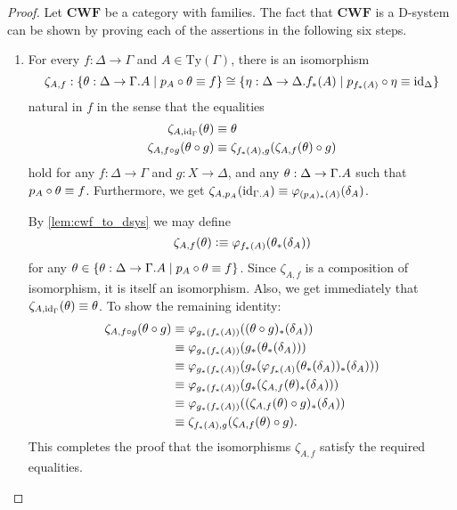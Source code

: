 \begin{proof}%
Let $\mathbf{CWF}$ be a category with families. The fact that $\mathbf{CWF}$ is
a D-system can be shown by proving each of the assertions in the following six 
steps.
\begin{enumerate}
\item For every $f:\Delta\to\Gamma$ and $A\in\mathrm{Ty}(\Gamma)$, there is an
isomorphism
\begin{equation*}
\zeta_{A,f}:\{\theta:\Delta\to\ctxext{\Gamma}{A}\mid p_A\circ\theta\jdeq f\}
  \cong
\{\eta:\Delta\to\ctxext{\Delta}{f_\ast(A)}\mid p_{f_\ast(A)}\circ\eta\jdeq\catid{\Delta}\}
\end{equation*}
natural in $f$ in the sense that the equalities
\begin{align*}
\zeta_{A,{\mathrm{id}_{\Gamma}}}(\theta) & \equiv \theta \\
\zeta_{A,f\circ g}(\theta\circ g) & \equiv \zeta_{f_\ast(A),g}(\zeta_{A,f}(\theta)\circ g)
\end{align*}
hold for any $f:\Delta\to\Gamma$ and $g:X\to\Delta$, and any $\theta:\Delta\to\ctxext{\Gamma}{A}$
such that $p_A\circ\theta\equiv f$.
Furthermore, we get $\zeta_{A,p_A}(\catid{\ctxext{\Gamma}{A}})\jdeq\varphi_{(p_A)_\ast(A)}(\delta_A)$.

\medskip
By \autoref{lem:cwf_to_dsys} we may define
\begin{equation*}
\zeta_{A,f}(\theta)\vcentcolon\equiv \varphi_{f_\ast(A)}(\theta_\ast(\delta_A))
\end{equation*}
for any $\theta\in\{\theta:\Delta\to\ctxext{\Gamma}{A}\mid p_A\circ\theta\jdeq f\}$. 
Since $\zeta_{A,f}$ is a composition of isomorphism, it is itself an isomorphism.
Also, we get immediately that $\zeta_{A,{\mathrm{id}_{\Gamma}}}(\theta)\equiv\theta$. To
show the remaining identity:
\begin{align*}
\zeta_{A,f\circ g}(\theta\circ g)
& \equiv \varphi_{g_\ast(f_\ast(A))}((\theta\circ g)_\ast(\delta_A)) \\
& \equiv \varphi_{g_\ast(f_\ast(A))}(g_\ast(\theta_\ast(\delta_A))) \\
& \equiv \varphi_{g_\ast(f_\ast(A))}(g_\ast(\varphi_{f_\ast(A)}(\theta_\ast(\delta_A))_\ast(\delta_A))) \\
& \equiv \varphi_{g_\ast(f_\ast(A))}(g_\ast(\zeta_{A,f}(\theta)_\ast(\delta_A))) \\
& \equiv \varphi_{g_\ast(f_\ast(A))}((\zeta_{A,f}(\theta)\circ g)_\ast(\delta_A)) \\
& \equiv \zeta_{f_\ast(A),g}(\zeta_{A,f}(\theta)\circ g).
\end{align*}
This completes the proof that the isomorphisms $\zeta_{A,f}$ satisfy the required
equalities.


\end{enumerate}
\end{proof}

